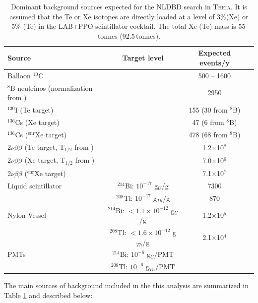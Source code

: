 \begin{table}[t]
\centering
\begin{tabular}{lccc}
\toprule
{\bf Source} & {\bf Target level} & Expected events/y \\
\midrule
Balloon $^{10}$C  & & 500 -- 1600 \\
$^{8}$B neutrinos (normalization from \cite{SNO_3ph}) &  & 2950  \\
$^{130}$I (Te target)  &  & 155  (30 from $^{8}$B) \\
$^{136}$Cs (Xe target) &   & 47 (6 from $^{8}$B)   \\
$^{136}$Cs ($^\mathrm{enr}$Xe target) & & 478 (68 from $^{8}$B) \\
2$\nu\beta\beta$ (Te target, T$_{1/2}$ from \cite{Cuore017}) &   & 1.2$\times$10$^{8}$   \\  
2$\nu\beta\beta$ (Xe target,  T$_{1/2}$ from \cite{gando16, exo14})  & & 7.0$\times$10$^{6}$   \\  
2$\nu\beta\beta$ ($^\mathrm{enr}$Xe target) &  &  7.1$\times$10$^{7}$  \\  
Liquid scintillator & $^{214}$Bi: $10^{-17}$ g$_{U}$/g  & 7300  \\
   & $^{208}$Tl: $10^{-17}$ g$_{Th}$/g  & 870  \\
Nylon Vessel  \cite{radiopurityorg, kamLAND_Zen}  & $^{214}$Bi: $<1.1\times10^{-12}$ g$_{U}$/g & 1.2$\times$10$^{5}$   \\
 & $^{208}$Tl: $<1.6\times10^{-12}$ g$_{Th}$/g   & 2.1$\times$10$^{4}$   \\
PMTs  & $^{214}$Bi: $10^{-6}$ g$_{U}/$PMT  &    \\
 & $^{208}$Tl: $10^{-6}$ g$_{Th}/$PMT  & \\
\bottomrule
\end{tabular}
\caption{Dominant background sources expected for the NLDBD search in
\textsc{Theia}. It is assumed that the Te or Xe isotopes are directly loaded at a level of 3\%(Xe) or 5\% (Te) in the LAB+PPO scintillator cocktail. The total Xe (Te) mass is 55\,tonnes (92.5\,tonnes).}
\label{tab::bckg}
\end{table}

The main sources of background included in the this analysis are summarized in Table \ref{tab::bckg} and described below:

